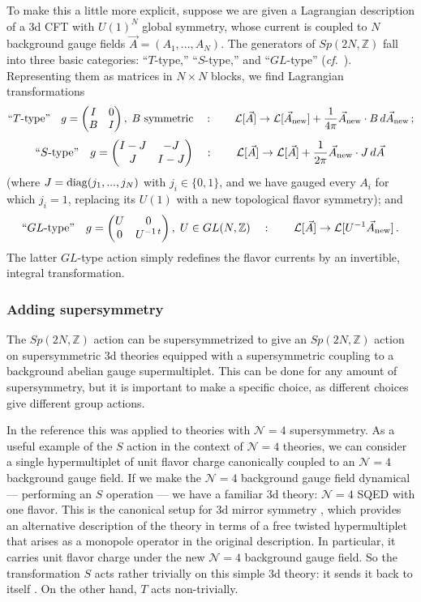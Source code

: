 \documentclass[hyper,letterpaper]{JHEP3}
\numberwithin{equation}{section}
\newcommand{\be}{\begin{equation}}
\newcommand{\ee}{\end{equation}}
\newcommand{\cf}{\emph{cf.}}
\newcommand{\Z}{{\mathbb Z}}
\newcommand{\CL}{\mathcal{L}}
\newcommand{\CN}{\mathcal{N}}
\begin{document}
To make this a little more explicit, suppose we are given a Lagrangian description of
a 3d CFT with $U(1)^N$ global symmetry, whose current is coupled to $N$ background
gauge fields $\vec A=(A_1,...,A_N)$.
The generators of $Sp(2N,\Z)$ fall into three basic categories: ``$T$-type,'' ``$S$-type,''
and ``$GL$-type'' (\cf\ \cite{HuaReiner}). Representing them as matrices in $N\times N$ blocks,
we find Lagrangian transformations
%
\be \text{``$T$-type''}\quad g=\begin{pmatrix} I & 0 \\ B & I \end{pmatrix},\; \text{$B$ symmetric}\quad:\qquad \CL[\vec{A}]\to\CL[\vec{A}_{\rm new}]+\frac{1}{4\pi} \vec A_{\rm new} \cdot B\,d\vec{A}_{\rm new}\,; \label{SpT} \ee
%
\be \text{``$S$-type''}\quad g= \begin{pmatrix}I-J & -J \\ J & I-J \end{pmatrix}\quad:\qquad \CL[\vec A]\to\CL[\vec A]+\frac{1}{2\pi} \vec{A}_{\rm new}\cdot J\,d\vec A\, \label{SpS} \ee
%
(where $J={\rm diag}(j_1,...,j_N)$ with $j_i\in \{0,1\}$, and we have gauged every $A_i$ for which $j_i=1$, replacing its $U(1)$ with a new topological flavor symmetry); and
%
\be \text{``$GL$-type''}\quad g = \begin{pmatrix} U & 0 \\ 0 & U^{-1\,t}\end{pmatrix},\;U\in GL(N,\Z)\quad:\qquad \CL[\vec A]\to \CL[U^{-1}\vec A_{\rm new}]\,. \label{SpGL}
\ee
%
The latter $GL$-type action simply redefines the flavor currents by an invertible, integral transformation.


\subsubsection{Adding supersymmetry}
\label{sec:susySp}

The $Sp(2N,\Z)$ action can be supersymmetrized to give an $Sp(2N,\Z)$ action on supersymmetric 3d theories
equipped with a supersymmetric coupling to a background abelian gauge supermultiplet.
This can be done for any amount of supersymmetry, but it is important to make a specific choice, as different choices give different group actions.


In the reference \cite{GW-Sduality} this was applied to theories with $\CN=4$ supersymmetry.
As a useful example of the $S$ action in the context of $\CN=4$ theories, we can consider a single hypermultiplet
of unit flavor charge canonically coupled to an $\CN=4$ background gauge field.
If we make the $\CN=4$ background gauge field dynamical --- performing an $S$ operation --- we have a familiar 3d theory: $\CN=4$ SQED with one flavor. This is the canonical setup for 3d mirror symmetry \cite{IS, dBHOY}, which provides an alternative description of the theory in terms of a free twisted hypermultiplet
that arises as a monopole operator in the original description.
In particular, it carries unit flavor charge under the new $\CN=4$ background gauge field. So the transformation
$S$ acts rather trivially on this simple 3d theory: it sends it back to itself \cite{KS-mirror}. On the other hand, $T$ acts non-trivially.
\end{document}
